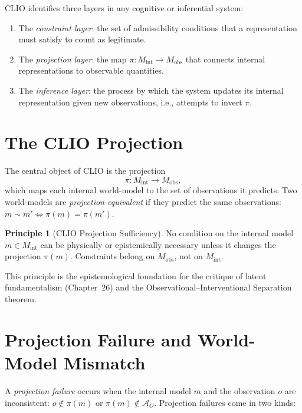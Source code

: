 \documentclass[12pt,a4paper]{book}
\theoremstyle{remark}
\theoremstyle{definition}
\newtheorem{principle}{Principle}[chapter]
\begin{document}
CLIO identifies three layers in any cognitive or inferential system:
\begin{enumerate}[label=(\roman*)]
  \item The \emph{constraint layer}: the set of admissibility conditions
        that a representation must satisfy to count as legitimate.
  \item The \emph{projection layer}: the map $\pi : M_{\mathrm{int}} \to
        M_{\mathrm{obs}}$ that connects internal representations to
        observable quantities.
  \item The \emph{inference layer}: the process by which the system
        updates its internal representation given new observations, i.e.,
        attempts to invert $\pi$.
\end{enumerate}

\section{The CLIO Projection}

The central object of CLIO is the projection
\begin{equation}
  \pi : M_{\mathrm{int}} \to M_{\mathrm{obs}},
\end{equation}
which maps each internal world-model to the set of observations it
predicts. Two world-models are \emph{projection-equivalent} if they
predict the same observations: $m \sim m' \iff \pi(m) = \pi(m')$.

\begin{principle}[CLIO Projection Sufficiency]
No condition on the internal model $m \in M_{\mathrm{int}}$ can be
physically or epistemically necessary unless it changes the projection
$\pi(m)$. Constraints belong on $M_{\mathrm{obs}}$, not on
$M_{\mathrm{int}}$.
\end{principle}

This principle is the epistemological foundation for the critique of
latent fundamentalism (Chapter~26) and the Observational--Interventional
Separation theorem.

\section{Projection Failure and World-Model Mismatch}

A \emph{projection failure} occurs when the internal model $m$ and the
observation $o$ are inconsistent: $o \notin \pi(m)$ or $\pi(m) \notin
\mathcal{A}_O$. Projection failures come in two kinds:
\end{document}
